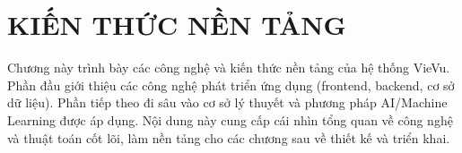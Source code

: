 \chapter{KIẾN THỨC NỀN TẢNG}
Chương này trình bày các công nghệ và kiến thức nền tảng của hệ thống VieVu. Phần đầu giới thiệu các công nghệ phát triển ứng dụng (frontend, backend, cơ sở dữ liệu). Phần tiếp theo đi sâu vào cơ sở lý thuyết và phương pháp AI/Machine Learning được áp dụng. Nội dung này cung cấp cái nhìn tổng quan về công nghệ và thuật toán cốt lõi, làm nền tảng cho các chương sau về thiết kế và triển khai.



